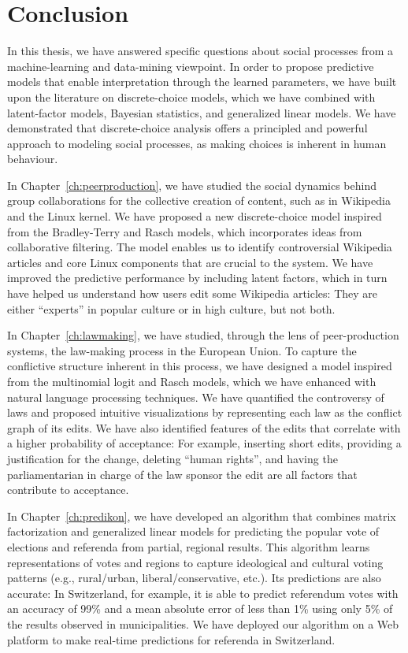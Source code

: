 \chapter{Conclusion}
\label{ch:conclusion}

In this thesis, we have answered specific questions about social processes from a machine-learning and data-mining viewpoint.
In order to propose predictive models that enable interpretation through the learned parameters, we have built upon the literature on discrete-choice models, which we have combined with latent-factor models, Bayesian statistics, and generalized linear models.
We have demonstrated that discrete-choice analysis offers a principled and powerful approach to modeling social processes, as making choices is inherent in human behaviour.

In Chapter~\ref{ch:peerproduction}, we have studied the social dynamics behind group collaborations for the collective creation of content, such as in Wikipedia and the Linux kernel.
We have proposed a new discrete-choice model inspired from the Bradley-Terry and Rasch models, which incorporates ideas from collaborative filtering.
The model enables us to identify controversial Wikipedia articles and core Linux components that are crucial to the system.
We have improved the predictive performance by including latent factors, which in turn have helped us understand how users edit some Wikipedia articles:
They are either ``experts'' in popular culture or in high culture, but not both.

In Chapter~\ref{ch:lawmaking}, we have studied, through the lens of peer-production systems, the law-making process in the European Union.
To capture the conflictive structure inherent in this process, we have designed a model inspired from the multinomial logit and Rasch models, which we have enhanced with natural language processing techniques.
We have quantified the controversy of laws and proposed intuitive visualizations by representing each law as the conflict graph of its edits.
We have also identified features of the edits that correlate with a higher probability of acceptance:
For example, inserting short edits, providing a justification for the change, deleting ``human rights'', and having the parliamentarian in charge of the law sponsor the edit are all factors that contribute to acceptance.

In Chapter~\ref{ch:predikon}, we have developed an algorithm that combines matrix factorization and generalized linear models for predicting the popular vote of elections and referenda from partial, regional results.
This algorithm learns representations of votes and regions to capture ideological and cultural voting patterns (e.g., rural/urban, liberal/conservative, etc.).
Its predictions are also accurate:
In Switzerland, for example, it is able to predict referendum votes with an accuracy of 99\% and a mean absolute error of less than 1\% using only 5\% of the results observed in municipalities.
We have deployed our algorithm on a Web platform to make real-time predictions for referenda in Switzerland.

